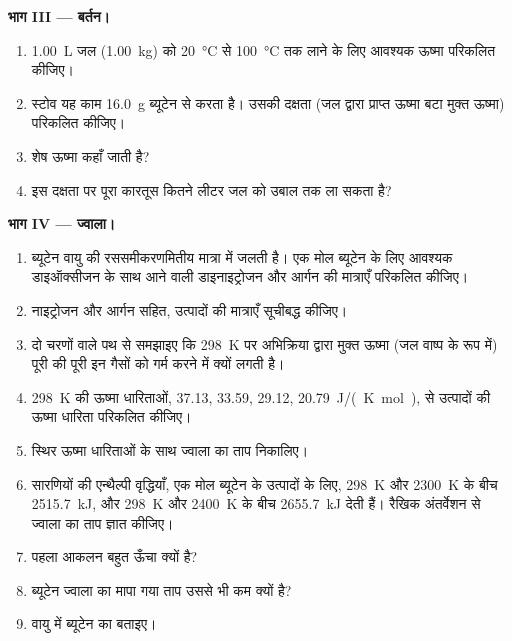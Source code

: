 \begin{problem}[{सप्ताहांत समस्या --- ब्यूटेन की ऊर्जा, बम कैलोरीमीटर में
एक मापन, बर्तन में गर्म किया गया पानी, और ज्वाला का
ताप}]
\medskip
\noindent\textbf{भाग III --- बर्तन।}
\begin{enumerate}[resume]
  \item \qty{1.00}{L} जल
        (\qty{1.00}{kg}) को \qty{20}{\celsius} से \qty{100}{\celsius} तक लाने के लिए आवश्यक ऊष्मा परिकलित कीजिए।
  \item स्टोव यह काम \qty{16.0}{g} ब्यूटेन से करता है। उसकी
        दक्षता (जल द्वारा प्राप्त ऊष्मा बटा मुक्त ऊष्मा) परिकलित कीजिए।
  \item शेष ऊष्मा कहाँ जाती है?
  \item इस दक्षता पर पूरा कारतूस कितने लीटर जल को उबाल तक
        ला सकता है?
\end{enumerate}

\medskip
\noindent\textbf{भाग IV --- ज्वाला।}
\begin{enumerate}[resume]
  \item ब्यूटेन वायु की रससमीकरणमितीय मात्रा में जलती है। एक मोल ब्यूटेन
        के लिए आवश्यक डाइऑक्सीजन के साथ आने वाली डाइनाइट्रोजन और आर्गन की
        मात्राएँ परिकलित कीजिए।
  \item नाइट्रोजन और आर्गन सहित, उत्पादों की मात्राएँ सूचीबद्ध कीजिए।
  \item दो चरणों वाले पथ से समझाइए कि
        \qty{298}{K} पर अभिक्रिया द्वारा मुक्त ऊष्मा (जल वाष्प के रूप में) पूरी की पूरी इन गैसों को
        गर्म करने में क्यों लगती है।
  \item \qty{298}{K} की ऊष्मा धारिताओं,  37.13,
         33.59,  29.12,  \qty{20.79}{J/(K.mol)}, से
        उत्पादों की ऊष्मा धारिता परिकलित कीजिए।
  \item स्थिर ऊष्मा धारिताओं के साथ ज्वाला का ताप निकालिए।
  \item सारणियों की एन्थैल्पी वृद्धियाँ, एक मोल ब्यूटेन के उत्पादों के लिए,
        \qty{298}{K} और \qty{2300}{K} के बीच \qty{2515.7}{kJ}, और
        \qty{298}{K} और \qty{2400}{K} के बीच \qty{2655.7}{kJ} देती हैं।
        रैखिक अंतर्वेशन से ज्वाला का ताप ज्ञात कीजिए।
  \item पहला आकलन बहुत ऊँचा क्यों है?
  \item ब्यूटेन ज्वाला का मापा गया ताप उससे भी कम क्यों है?
  \item वायु में ब्यूटेन का  बताइए।
\end{enumerate}
\end{problem}
